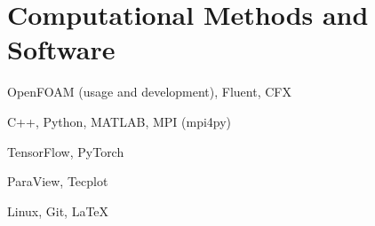 \section{Computational Methods and Software}

\begin{description}[leftmargin=0cm,labelindent=0cm]
    \item[\textbf{CFD:}] OpenFOAM (usage and development), Fluent, CFX
    \item[\textbf{Programming \& HPC:}] C++, Python, MATLAB, MPI (mpi4py)
    \item[\textbf{AI / ML:}] TensorFlow, PyTorch
    \item[\textbf{Post-processing:}] ParaView, Tecplot
    \item[\textbf{Tools:}] Linux, Git, \LaTeX
\end{description}
